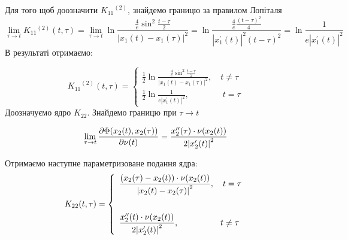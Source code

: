 \documentclass[14pt,a4paper]{extarticle}
\newcounter{e}
\numberwithin{equation}{section}
\numberwithin{figure}{section}
\begin{document}
Для того щоб доозначити ${K_{11}}^{(2)}$, знайдемо границю за правилом Лопіталя
$$
\lim _{\tau \rightarrow t} K_{11}{ }^{(2)}(t, \tau) = \lim _{\tau \rightarrow t} \ln \frac{\frac{4}{e} \sin ^{2} \frac{t-\tau}{2}}{\left|x_{1}(t)-x_{1}(\tau)\right|^{2}}=\ln \frac{\frac{4}{e} \frac{(t-\tau)^{2}}{4}}{\left|x_{1}^{\prime}(t)\right|^{2}(t-\tau)^{2}}=\ln \frac{1}{e\left|x_{1}^{\prime}(t)\right|^{2}}
$$
В результаті отримаємо:

\begin{equation}
	{K_{11}}^{(2)}(t, \tau) =
	\left\{
	\begin{array}{l}
		\displaystyle
		\frac{1}{2} \ln{\frac{\frac{4}{e} \sin ^{2} \frac{t-\tau}{2}}{\left|x_{1}(t)-x_{1}(\tau)\right|^{2}}}
		,\quad t \neq \tau
		\\ [1cm]
		
		\displaystyle
		\frac{1}{2} \ln \frac{1}{e\left|x_{1}^{\prime}(t)\right|^{2}}
		,\quad  \quad  \quad  \quad   t = \tau
	\end{array}
	\right.
\end{equation}
Доозначуємо ядро $K_{22}$. Знайдемо границю при $\tau \rightarrow t$

$$
\lim_{\tau \rightarrow t } \pdv{\Phi(x_{2}(t), x_{2}(\tau))}{\nu(t)} =
\frac{  x''_{2}(\tau) \cdot \nu (x_2(t)) }{ 2\abs{ x'_{2}(t)}^2 } 
$$

Отримаємо наступне параметризоване подання ядра:
 \begin{equation}
	 K_{22}(t, \tau) = 
	 \left\{
	 \begin{array}{l}
		 \displaystyle
		 \frac{ \left( x_{2}(\tau) - x_{2}(t) \right) \cdot \nu (x_2(t)) }{ \abs{ x_{2}(t)-x_{2}(\tau) }^2 } 
		 ,\quad t = \tau
		 \\ [1cm]
	 
	 	\displaystyle
	 	\frac{  x''_{2}(t) \cdot \nu (x_2(t)) }{ 2\abs{ x'_{2}(t)}^2 } 
	 	,\quad \quad  \quad  \quad  \quad  t \neq \tau
	 \end{array}
	 \right.
 \end{equation}
\end{document}
